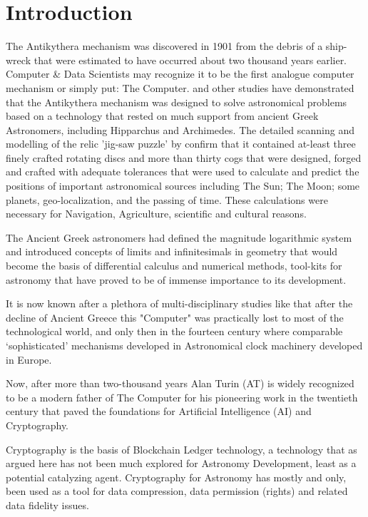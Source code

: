 \documentclass[final,5p,times,twocolumn,authoryear]{elsarticle}
\begin{document}
\section{Introduction}
\label{sec:intro}
%
 The Antikythera mechanism was discovered in 1901 from the debris of a ship-wreck that were estimated to have occurred about two thousand years earlier. Computer \& Data Scientists may recognize it to be the first analogue computer mechanism or simply put: The Computer. \citet{Freeth2021} and other studies have demonstrated that the Antikythera mechanism was designed to solve astronomical problems based on a technology that rested on much support from ancient Greek Astronomers, including Hipparchus and Archimedes. The detailed scanning and modelling of the relic 'jig-saw puzzle' by \citet{freeth2021} confirm that it contained at-least three finely crafted rotating discs and more than thirty cogs that were designed, forged and crafted with adequate tolerances that were used to calculate and predict the positions of important astronomical sources including The Sun; The Moon; some planets, geo-localization, and the passing of time. These calculations were necessary for Navigation, Agriculture, scientific and cultural reasons. 
 
 The Ancient Greek astronomers had defined the magnitude logarithmic system and introduced concepts of limits and infinitesimals in geometry that would become the basis of differential calculus and numerical methods, tool-kits for astronomy that have proved to be of immense importance to its development.
 
 It is now known after a plethora of multi-disciplinary studies like \citet{Freeth2021} that after the decline of Ancient Greece this "Computer" was practically lost to most of the technological world, and only then in the fourteen century where comparable `sophisticated' mechanisms developed in Astronomical clock machinery developed in Europe. 
 
 Now, after more than two-thousand years Alan Turin (AT) is widely recognized to be a modern father of The Computer for his pioneering  work in the twentieth century that paved the foundations for Artificial Intelligence (AI) and Cryptography. 
 
Cryptography is the basis of Blockchain Ledger technology, a technology that as argued here has not been much explored for Astronomy Development, least as a potential catalyzing agent. Cryptography for Astronomy has mostly and only, been used as a tool for data compression, data permission (rights) and related data fidelity issues.
\end{document}
